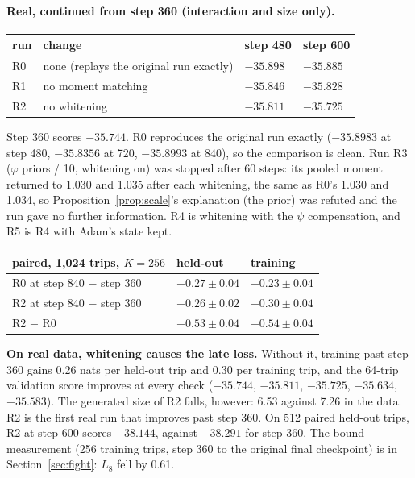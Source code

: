 \documentclass[11pt]{article}
\theoremstyle{remark}\newtheorem{remark}{Remark}
\begin{document}
\paragraph{Real, continued from step 360 (interaction and size only).}
\begin{center}\small
\begin{tabular}{llll}
\toprule
run & change & step 480 & step 600\\
\midrule
R0 & none (replays the original run exactly) & $-35.898$ & $-35.885$\\
R1 & no moment matching & $-35.846$ & $-35.828$\\
R2 & no whitening & $-35.811$ & $\mathbf{-35.725}$\\
\bottomrule
\end{tabular}
\end{center}
Step 360 scores $-35.744$. R0 reproduces the original run exactly ($-35.8983$ at step 480,
$-35.8356$ at 720, $-35.8993$ at 840), so the comparison is clean. Run R3 ($\varphi$ priors / 10,
whitening on) was stopped after 60 steps: its pooled moment returned to 1.030 and 1.035 after each
whitening, the same as R0's 1.030 and 1.034, so Proposition~\ref{prop:scale}'s explanation (the
prior) was refuted and the run gave no further information. R4 is whitening with the $\psi$
compensation, and R5 is R4 with Adam's state kept.

\begin{center}\small
\begin{tabular}{lll}
\toprule
paired, 1,024 trips, $K=256$ & held-out & training\\
\midrule
R0 at step 840 $-$ step 360 & $-0.27\pm0.04$ & $-0.23\pm0.04$\\
R2 at step 840 $-$ step 360 & $\mathbf{+0.26\pm0.02}$ & $\mathbf{+0.30\pm0.04}$\\
R2 $-$ R0 & $+0.53\pm0.04$ & $+0.54\pm0.04$\\
\bottomrule
\end{tabular}
\end{center}
\textbf{On real data, whitening causes the late loss.} Without it, training past step 360 gains
0.26 nats per held-out trip and 0.30 per training trip, and the 64-trip validation score improves at
every check ($-35.744$, $-35.811$, $-35.725$, $-35.634$, $-35.583$). The generated size of R2
falls, however: 6.53 against 7.26 in the data. R2 is the first real run that improves past step 360. On 512 paired held-out
trips, R2 at step 600 scores $-38.144$, against $-38.291$ for step 360. The bound measurement (256
training trips, step 360 to the original final checkpoint) is in Section~\ref{sec:fight}: $L_8$ fell
by 0.61.
\end{document}
